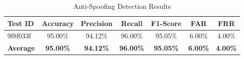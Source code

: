 \begin{table}[htbp]
\centering
\caption{Anti-Spoofing Detection Results}
\label{tab:antispoofing_results}
\begin{tabular}{|l|c|c|c|c|c|c|}
\hline
\textbf{Test ID} & \textbf{Accuracy} & \textbf{Precision} & \textbf{Recall} & \textbf{F1-Score} & \textbf{FAR} & \textbf{FRR} \\
\hline
9f8f033f & 95.00\% & 94.12\% & 96.00\% & 95.05\% & 6.00\% & 4.00\% \\
\hline
\hline
\textbf{Average} & \textbf{95.00\%} & \textbf{94.12\%} & \textbf{96.00\%} & \textbf{95.05\%} & \textbf{6.00\%} & \textbf{4.00\%} \\
\hline
\end{tabular}
\end{table}